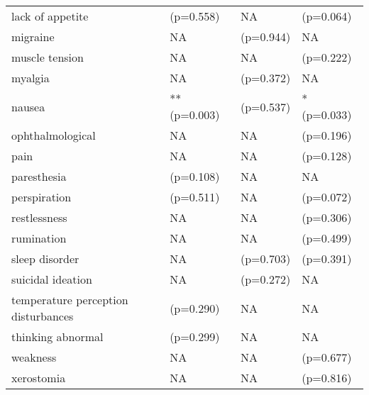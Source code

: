 \begin{table}[!h]
\begin{tabular}[t]{llll}
lack of appetite & (p=0.558) & NA & (p=0.064)\\
\addlinespace
migraine & NA & (p=0.944) & NA\\
muscle tension & NA & NA & (p=0.222)\\
myalgia & NA & (p=0.372) & NA\\
nausea & ** (p=0.003) & (p=0.537) & * (p=0.033)\\
ophthalmological & NA & NA & (p=0.196)\\
\addlinespace
pain & NA & NA & (p=0.128)\\
paresthesia & (p=0.108) & NA & NA\\
perspiration & (p=0.511) & NA & (p=0.072)\\
restlessness & NA & NA & (p=0.306)\\
rumination & NA & NA & (p=0.499)\\
\addlinespace
sleep disorder & NA & (p=0.703) & (p=0.391)\\
suicidal ideation & NA & (p=0.272) & NA\\
temperature perception disturbances & (p=0.290) & NA & NA\\
thinking abnormal & (p=0.299) & NA & NA\\
weakness & NA & NA & (p=0.677)\\
\addlinespace
xerostomia & NA & NA & (p=0.816)\\
\bottomrule
\end{tabular}
\end{table}
